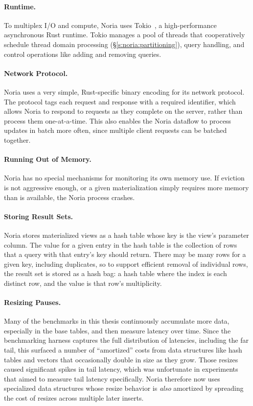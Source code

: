 \paragraph{Runtime.}
To multiplex I/O and compute, Noria uses Tokio~\cite{tokio}, a high-performance
asynchronous Rust runtime. Tokio manages a pool of threads that cooperatively
schedule thread domain processing (\S\ref{s:noria:partitioning}), query
handling, and control operations like adding and removing queries.

\paragraph{Network Protocol.}
Noria uses a very simple, Rust-specific binary encoding for its network
protocol. The protocol tags each request and response with a required
identifier, which allows Noria to respond to requests as they complete on the
server, rather than process them one-at-a-time. This also enables the Noria
dataflow to process updates in batch more often, since multiple client requests
can be batched together.

\paragraph{Running Out of Memory.}
Noria has no special mechanisms for monitoring its own memory use. If eviction
is not aggressive enough, or a given materialization simply requires more memory
than is available, the Noria process crashes.

\paragraph{Storing Result Sets.}
Noria stores materialized views as a hash table whose key is the view's
parameter column. The value for a given entry in the hash table is the
collection of rows that a query with that entry's key should return. There
may be many rows for a given key, including duplicates, so to support efficient
removal of individual rows, the result set is stored as a hash bag: a hash table
where the index is each distinct row, and the value is that row's multiplicity.

\paragraph{Resizing Pauses.}
Many of the benchmarks in this thesis continuously accumulate more data,
especially in the base tables, and then measure latency over time. Since the
benchmarking harness captures the full distribution of latencies, including the
far tail, this surfaced a number of ``amortized'' costs from data structures
like hash tables and vectors that occasionally double in size as they grow.
Those resizes caused significant spikes in tail latency, which was unfortunate
in experiments that aimed to measure tail latency specifically. Noria therefore
now uses specialized data structures whose resize behavior is \emph{also}
amortized by spreading the cost of resizes across multiple later inserts.

